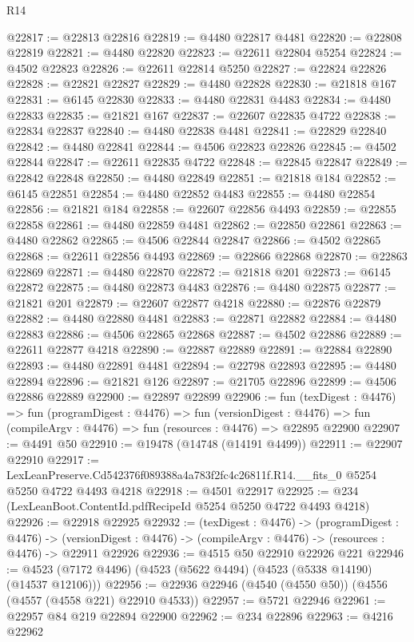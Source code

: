 \begin{lexlean}{R14}
\begin{coremodule}
@22817 := @22813 @22816
@22819 := @4480 @22817 @4481
@22820 := @22808 @22819
@22821 := @4480 @22820
@22823 := @22611 @22804 @5254
@22824 := @4502 @22823
@22826 := @22611 @22814 @5250
@22827 := @22824 @22826
@22828 := @22821 @22827
@22829 := @4480 @22828
@22830 := @21818 @167
@22831 := @6145 @22830
@22833 := @4480 @22831 @4483
@22834 := @4480 @22833
@22835 := @21821 @167
@22837 := @22607 @22835 @4722
@22838 := @22834 @22837
@22840 := @4480 @22838 @4481
@22841 := @22829 @22840
@22842 := @4480 @22841
@22844 := @4506 @22823 @22826
@22845 := @4502 @22844
@22847 := @22611 @22835 @4722
@22848 := @22845 @22847
@22849 := @22842 @22848
@22850 := @4480 @22849
@22851 := @21818 @184
@22852 := @6145 @22851
@22854 := @4480 @22852 @4483
@22855 := @4480 @22854
@22856 := @21821 @184
@22858 := @22607 @22856 @4493
@22859 := @22855 @22858
@22861 := @4480 @22859 @4481
@22862 := @22850 @22861
@22863 := @4480 @22862
@22865 := @4506 @22844 @22847
@22866 := @4502 @22865
@22868 := @22611 @22856 @4493
@22869 := @22866 @22868
@22870 := @22863 @22869
@22871 := @4480 @22870
@22872 := @21818 @201
@22873 := @6145 @22872
@22875 := @4480 @22873 @4483
@22876 := @4480 @22875
@22877 := @21821 @201
@22879 := @22607 @22877 @4218
@22880 := @22876 @22879
@22882 := @4480 @22880 @4481
@22883 := @22871 @22882
@22884 := @4480 @22883
@22886 := @4506 @22865 @22868
@22887 := @4502 @22886
@22889 := @22611 @22877 @4218
@22890 := @22887 @22889
@22891 := @22884 @22890
@22893 := @4480 @22891 @4481
@22894 := @22798 @22893
@22895 := @4480 @22894
@22896 := @21821 @126
@22897 := @21705 @22896
@22899 := @4506 @22886 @22889
@22900 := @22897 @22899
@22906 := fun (texDigest : @4476) =>
  fun (programDigest : @4476) =>
  fun (versionDigest : @4476) =>
  fun (compileArgv : @4476) => fun (resources : @4476) => @22895 @22900
@22907 := @4491 @50
@22910 := @19478 (@14748 (@14191 @4499))
@22911 := @22907 @22910
@22917 := LexLeanPreserve.Cd542376f089388a4a783f2fc4c26811f.R14.__fits_0
    @5254
    @5250
    @4722
    @4493
    @4218
@22918 := @4501 @22917
@22925 := @234 (LexLeanBoot.ContentId.pdfRecipeId @5254 @5250 @4722 @4493 @4218)
@22926 := @22918 @22925
@22932 := (texDigest : @4476) ->
  (programDigest : @4476) ->
  (versionDigest : @4476) -> (compileArgv : @4476) -> (resources : @4476) -> @22911 @22926
@22936 := @4515 @50 @22910 @22926 @221
@22946 := @4523 (@7172 @4496) (@4523 (@5622 @4494) (@4523 (@5338 @14190) (@14537 @12106)))
@22956 := @22936 @22946 (@4540 (@4550 @50)) (@4556 (@4557 (@4558 @221) @22910 @4533))
@22957 := @5721 @22946
@22961 := @22957 @84 @219 @22894 @22900
@22962 := @234 @22896
@22963 := @4216 @22962

\end{coremodule}
\end{lexlean}
